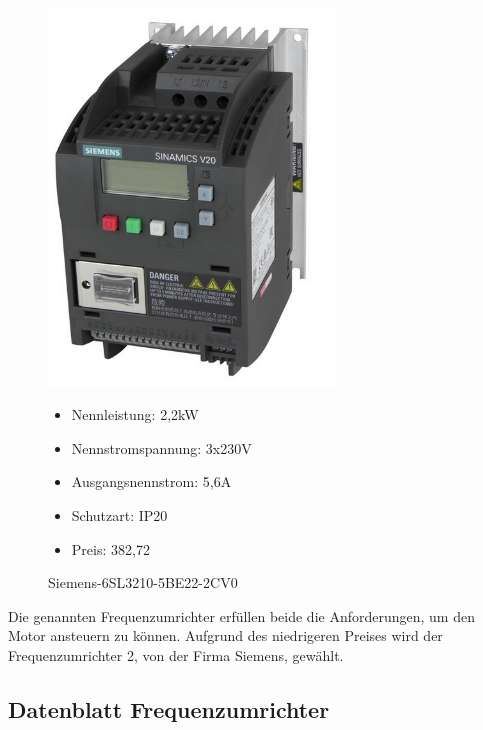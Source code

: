 \begin{figure}[H]
\begin{minipage}[t]{0.45\textwidth}
\end{minipage}
\hspace{0.1\textwidth}
\begin{minipage}[t]{0.45\textwidth}

\includegraphics[width=0.68\textwidth]{fig/SiemensV20}
\caption{Siemens-6SL3210-5BE22-2CV0}

\begin{itemize}
	\item{Nennleistung: 2,2kW}
	\item{Nennstromspannung: 3x230V}
	\item{Ausgangsnennstrom: 5,6A}
	\item{Schutzart: IP20}
	\item{Preis: 382,72\textsf{\texteuro}}
\end{itemize}

\end{minipage}
\end{figure}

Die genannten Frequenzumrichter erfüllen beide die Anforderungen, um den Motor ansteuern zu können. Aufgrund des niedrigeren Preises wird der Frequenzumrichter 2, von der Firma Siemens, gewählt. 

\subsection{Datenblatt Frequenzumrichter}
\label{sec:datenblattFrequenzumrichter}

